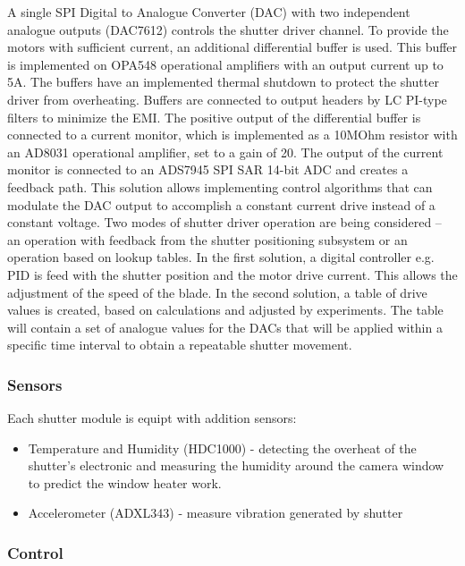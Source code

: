 A single SPI Digital to Analogue Converter (DAC) with two independent analogue outputs (DAC7612) controls the shutter driver channel. To provide the motors with sufficient current, an additional differential buffer is used. This buffer is implemented on OPA548 operational amplifiers with an output current up to 5A. The buffers have an implemented thermal shutdown to protect the shutter driver from overheating. Buffers are connected to output headers by LC PI-type filters to minimize the EMI.
The positive output of the differential buffer is connected to a current monitor, which is implemented as a 10MOhm resistor with an AD8031 operational amplifier, set to a gain of 20. The output of the current monitor is connected to an ADS7945 SPI SAR 14-bit ADC and creates a feedback path. This solution allows implementing control algorithms that can modulate the DAC output to accomplish a constant current drive instead of a constant voltage.
Two modes of shutter driver operation are being considered – an operation with feedback from the shutter positioning subsystem or an operation based on lookup tables. In the first solution, a digital controller e.g. PID is feed with the shutter position and the motor drive current. This allows the adjustment of the speed of the blade. In the second solution, a table of drive values is created, based on calculations and adjusted by experiments. The table will contain a set of analogue values for the DACs that will be applied within a specific time interval to obtain a repeatable shutter movement.
\subsubsection{Sensors}

Each shutter module is equipt with addition sensors:
\begin{itemize}
\item Temperature and Humidity (HDC1000) - detecting the overheat of the shutter's electronic and measuring the humidity around the camera window to predict the window heater work.
\item Accelerometer (ADXL343) - measure vibration generated by shutter
\end{itemize}

\subsubsection{Control}

